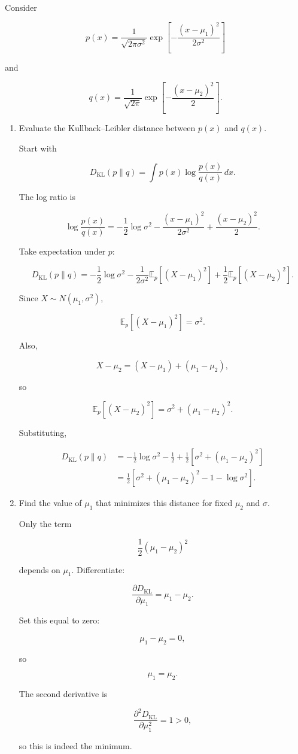 \documentclass[11pt]{article}
\newcommand{\E}{\mathbb{E}}
\newcommand{\KL}{D_{\mathrm{KL}}}
\begin{document}
Consider

\[
p(x)=\frac{1}{\sqrt{2\pi\sigma^2}}
\exp\left[-\frac{(x-\mu_1)^2}{2\sigma^2}\right]
\]

and

\[
q(x)=\frac{1}{\sqrt{2\pi}}
\exp\left[-\frac{(x-\mu_2)^2}{2}\right].
\]

\begin{enumerate}

\item Evaluate the Kullback--Leibler distance between \(p(x)\) and \(q(x)\).

Start with

\[
\KL(p\|q)
=
\int p(x)\log\frac{p(x)}{q(x)}\,dx.
\]

The log ratio is

\[
\log\frac{p(x)}{q(x)}
=
-\frac12\log\sigma^2
-\frac{(x-\mu_1)^2}{2\sigma^2}
+\frac{(x-\mu_2)^2}{2}.
\]

Take expectation under \(p\):

\[
\KL(p\|q)
=
-\frac12\log\sigma^2
-\frac{1}{2\sigma^2}
\E_p[(X-\mu_1)^2]
+\frac12\E_p[(X-\mu_2)^2].
\]

Since \(X\sim N(\mu_1,\sigma^2)\),

\[
\E_p[(X-\mu_1)^2]=\sigma^2.
\]

Also,

\[
X-\mu_2
=
(X-\mu_1)+(\mu_1-\mu_2),
\]

so

\[
\E_p[(X-\mu_2)^2]
=
\sigma^2+(\mu_1-\mu_2)^2.
\]

Substituting,

\begin{align*}
\KL(p\|q)
&=
-\frac12\log\sigma^2
-\frac12
+\frac12\left[
\sigma^2+(\mu_1-\mu_2)^2
\right] \\
&=
\frac12
\left[
\sigma^2+(\mu_1-\mu_2)^2-1-\log\sigma^2
\right].
\end{align*}

\item Find the value of \(\mu_1\) that minimizes this distance for fixed
\(\mu_2\) and \(\sigma\).

Only the term

\[
\frac12(\mu_1-\mu_2)^2
\]

depends on \(\mu_1\). Differentiate:

\[
\frac{\partial \KL}{\partial\mu_1}
=
\mu_1-\mu_2.
\]

Set this equal to zero:

\[
\mu_1-\mu_2=0,
\]

so

\[
\mu_1=\mu_2.
\]

The second derivative is

\[
\frac{\partial^2\KL}{\partial\mu_1^2}=1>0,
\]

so this is indeed the minimum.

\end{enumerate}
\end{document}
